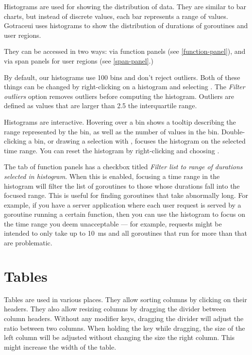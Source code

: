 \documentclass[10pt,letterpaper,oneside,openany,english]{memoir}
\newcommand{\shortcut}{\ctrl{} or \cmdmac}
\begin{document}
Histograms are used for showing the distribution of data.
They are similar to bar charts, but instead of discrete values, each bar represents a range of values.
Gotraceui uses histograms to show the distribution of durations of goroutines and user regions.

They can be accessed in two ways: via function panels (see \cref{function-panel}),
and via span panels for user regions (see \cref{span-panel}.)

By default, our histograms use 100 bins and don't reject outliers.
Both of these things can be changed by right-clicking on a histogram and selecting .
The \emph{Filter outliers} option removes outliers before computing the histogram.
Outliers are defined as values that are larger than 2.5\times{} the interquartile range.

Histograms are interactive.
Hovering over a bin shows a tooltip describing the range represented by the bin, as well as the number of values in the bin.
Double-clicking a bin, or drawing a selection with \keys{\shortcut + LMB}, focuses the histogram on the selected time range.
You can reset the histogram by right-clicking and choosing .

The  tab of function panels has a checkbox titled \emph{Filter list to range of durations selected in histogram}.
When this is enabled, focusing a time range in the histogram will filter the list of goroutines to those whose durations fall into the focused range.
This is useful for finding goroutines that take abnormally long.
For example, if you have a server application where each user request is served by a goroutine running a certain function,
then you can use the histogram to focus on the time range you deem unacceptable ---
for example, requests might be intended to only take up to \qty{10}{\milli\second} and all goroutines that run for more than that are problematic.

\section{Tables}\label{tables}

Tables are used in various places.
They allow sorting columns by clicking on their headers.
They also allow resizing columns by dragging the divider between column headers.
Without any modifier keys, dragging the divider will adjust the ratio between two columns.
When holding the \keys{\shift} key while dragging,
the size of the left column will be adjusted without changing the size the right column.
This might increase the width of the table.
\end{document}
